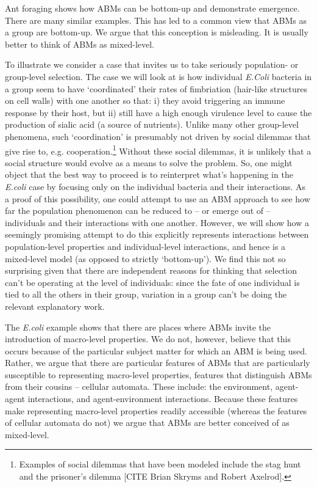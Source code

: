 \documentclass[11pt]{article}
\begin{document}
Ant foraging shows how ABMs can be bottom-up and demonstrate emergence. There are many similar examples. This has led to a common view that ABMs as a group are bottom-up. We argue that this conception is misleading. It is usually better to think of ABMs as mixed-level.

To illustrate we consider a case that invites us to take seriously population- or group-level selection.  The case we will look at is how individual \emph{E.Coli} bacteria in a group seem to have `coordinated'  their rates of fimbriation (hair-like structures on cell walls) with one another so that: i) they avoid triggering an immune response by their host, but ii) still have a high enough virulence level to cause the production of sialic acid (a source of nutrients).  Unlike many other group-level phenomena, such `coordination' is presumably not driven by social dilemmas that give rise to, e.g. cooperation.\footnote{Examples of social dilemmas that have been modeled include the stag hunt and the prisoner's dilemma [CITE Brian Skryms and Robert Axelrod].}  Without these social dilemmas, it is unlikely that a social structure would evolve as a means to solve the problem. So, one might object that the best way to proceed is to reinterpret what's happening in the \emph{E.coli} case by focusing only on the individual bacteria and their interactions. As a proof of this possibility, one could attempt to use an ABM approach to see how far the population phenomenon can be reduced to -- or emerge out of -- individuals and their interactions with one another. However, we will show how a seemingly promising attempt to do this explicitly represents interactions between population-level properties and individual-level interactions, and hence is a mixed-level model (as opposed to strictly `bottom-up'). We find this not so surprising given that there are independent reasons for thinking that selection can't be operating at the level of individuals: since the fate of one individual is tied to all the others in their group, variation in a group can't be doing the relevant explanatory work.

The \emph{E.coli} example shows that there are places where ABMs invite the introduction of macro-level properties.  We do not, however, believe that this occurs because of the particular subject matter for which an ABM is being used. Rather, we argue that there are particular features of ABMs that are particularly susceptible to representing macro-level properties, features that distinguish ABMs from their cousins -- cellular automata. These include: the environment, agent-agent interactions, and agent-environment interactions.  Because these features make representing macro-level properties readily accessible (whereas the features of cellular automata do not) we argue that ABMs are better conceived of as mixed-level.
\end{document}
